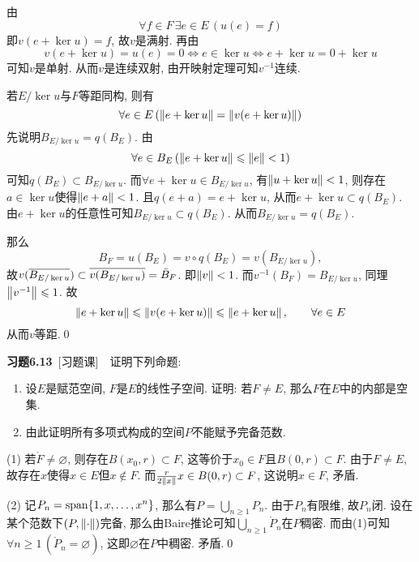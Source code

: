 \begin{Proof}
	由
	\[
	\forall f\in F\,\exists e\in E\,(u(e)=f)
	\]
	即$ v(e+\ker u)=f $, 故$ v $是满射. 再由
	\[
	v(e+\ker u)=u(e)=0\Longleftrightarrow e\in\ker u\Longleftrightarrow e+\ker u=0+\ker u
	\]
	可知$ v $是单射. 从而$ v $是连续双射, 由开映射定理可知$ v^{-1} $连续.
	
	若$ E/\ker u $与$ F $等距同构, 则有
	\[
	\forall e\in E\,(\norm{e+\ker u}=\norm{v(e+\ker u)})
	\]
	先说明$ B_{E/\ker u}=q(B_E) $. 由
	\[
	\forall e\in B_E\,(\norm{e+\ker u}\leqslant\norm{e}<1)
	\]
	可知$ q(B_E)\subset B_{E/\ker u} $. 而$ \forall e+\ker u\in B_{E/\ker u} $, 有$ \norm{u+\ker u}<1 $, 则存在$ a\in\ker u $使得$ \norm{e+a}<1 $. 且$ q(e+a)=e+\ker u $, 从而$ e+\ker u\subset q(B_E) $. 由$ e+\ker u $的任意性可知$ B_{E/\ker u}\subset q(B_E) $. 从而$ B_{E/\ker u}=q(B_E) $.
	
	那么
	\[
	B_F=u(B_E)=v\circ q(B_E)=v(B_{E/\ker u}),
	\]
	故$ v(\baro{B_{E/\ker u}})\subset\baro{v(B_{E/\ker u})}=\bar{B}_F $. 即$ \norm{v}<1 $. 而$ v^{-1}(B_F)=B_{E/\ker u} $, 同理$ \norm{v^{-1}}\leqslant 1 $. 故
	\[
	\norm{e+\ker u}\leqslant\norm{v(e+\ker u)}\leqslant\norm{e+\ker u},\qquad \forall e\in E
	\]
	从而$ v $等距.\qed
	\end{Proof}
	
	\textbf{习题6.13}\ [习题课]\ \ 证明下列命题:
	\begin{enumerate}[(1)]
	\item 设$ E $是赋范空间, $ F $是$ E $的线性子空间. 证明: 若$ F\ne E $, 那么$ F $在$ E $中的内部是空集.
	\item 由此证明所有多项式构成的空间$ P $不能赋予完备范数.
	\end{enumerate}
	\begin{Proof}
	(1) 若$ \mathring{F}\ne\varnothing $, 则存在$ B(x_0,r)\subset F $, 这等价于$ x_0\in F $且$ B(0,r)\subset F $. 由于$ F\ne E $, 故存在$ x $使得$ x\in E $但$ x\notin F $. 而$ \frac{r}{2\norm{x}}x\in B(0,r)\subset F $, 这说明$ x\in F $, 矛盾.
	
	(2) 记$ P_n=\Span\{ 1,x,\dots,x^n \} $, 那么有$ P=\bigcup_{n\geqslant 1}P_n $. 由于$ P_n $有限维, 故$ P_n $闭. 设在某个范数下$ (P,\norm{\cdot}) $完备, 那么由Baire推论可知$ \bigcup_{n\geqslant 1}\mathring{P}_n $在$ P $稠密. 而由(1)可知$ \forall n\geqslant 1\,(\mathring{P}_n=\varnothing) $, 这即$ \varnothing $在$ P $中稠密. 矛盾.\qed
	\end{Proof}
	
